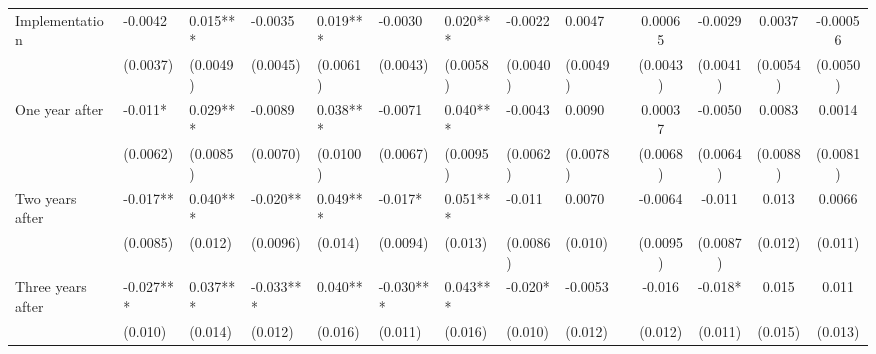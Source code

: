 \begin{tabular}{lccccrrrrrcccc}
Implementation & \multicolumn{1}{l}{-0.0042} & \multicolumn{1}{l}{0.015***} & \multicolumn{1}{l}{-0.0035} & \multicolumn{1}{l}{0.019***} & \multicolumn{1}{l}{-0.0030} & \multicolumn{1}{l}{0.020***} & \multicolumn{1}{l}{-0.0022} & \multicolumn{1}{l}{0.0047} &       & 0.00065 & -0.0029 & 0.0037 & -0.00056 \\
      & \multicolumn{1}{l}{(0.0037)} & \multicolumn{1}{l}{(0.0049)} & \multicolumn{1}{l}{(0.0045)} & \multicolumn{1}{l}{(0.0061)} & \multicolumn{1}{l}{(0.0043)} & \multicolumn{1}{l}{(0.0058)} & \multicolumn{1}{l}{(0.0040)} & \multicolumn{1}{l}{(0.0049)} &       & (0.0043) & (0.0041) & (0.0054) & (0.0050) \\
One year after & \multicolumn{1}{l}{-0.011*} & \multicolumn{1}{l}{0.029***} & \multicolumn{1}{l}{-0.0089} & \multicolumn{1}{l}{0.038***} & \multicolumn{1}{l}{-0.0071} & \multicolumn{1}{l}{0.040***} & \multicolumn{1}{l}{-0.0043} & \multicolumn{1}{l}{0.0090} &       & 0.00037 & -0.0050 & 0.0083 & 0.0014 \\
      & \multicolumn{1}{l}{(0.0062)} & \multicolumn{1}{l}{(0.0085)} & \multicolumn{1}{l}{(0.0070)} & \multicolumn{1}{l}{(0.0100)} & \multicolumn{1}{l}{(0.0067)} & \multicolumn{1}{l}{(0.0095)} & \multicolumn{1}{l}{(0.0062)} & \multicolumn{1}{l}{(0.0078)} &       & (0.0068) & (0.0064) & (0.0088) & (0.0081) \\
Two years after & \multicolumn{1}{l}{-0.017**} & \multicolumn{1}{l}{0.040***} & \multicolumn{1}{l}{-0.020**} & \multicolumn{1}{l}{0.049***} & \multicolumn{1}{l}{-0.017*} & \multicolumn{1}{l}{0.051***} & \multicolumn{1}{l}{-0.011} & \multicolumn{1}{l}{0.0070} &       & -0.0064 & -0.011 & 0.013 & 0.0066 \\
      & \multicolumn{1}{l}{(0.0085)} & \multicolumn{1}{l}{(0.012)} & \multicolumn{1}{l}{(0.0096)} & \multicolumn{1}{l}{(0.014)} & \multicolumn{1}{l}{(0.0094)} & \multicolumn{1}{l}{(0.013)} & \multicolumn{1}{l}{(0.0086)} & \multicolumn{1}{l}{(0.010)} &       & (0.0095) & (0.0087) & (0.012) & (0.011) \\
Three years after & \multicolumn{1}{l}{-0.027***} & \multicolumn{1}{l}{0.037***} & \multicolumn{1}{l}{-0.033***} & \multicolumn{1}{l}{0.040**} & \multicolumn{1}{l}{-0.030***} & \multicolumn{1}{l}{0.043***} & \multicolumn{1}{l}{-0.020*} & \multicolumn{1}{l}{-0.0053} &       & -0.016 & -0.018* & 0.015 & 0.011 \\
      & \multicolumn{1}{l}{(0.010)} & \multicolumn{1}{l}{(0.014)} & \multicolumn{1}{l}{(0.012)} & \multicolumn{1}{l}{(0.016)} & \multicolumn{1}{l}{(0.011)} & \multicolumn{1}{l}{(0.016)} & \multicolumn{1}{l}{(0.010)} & \multicolumn{1}{l}{(0.012)} &       & (0.012) & (0.011) & (0.015) & (0.013) \\

\end{tabular}
